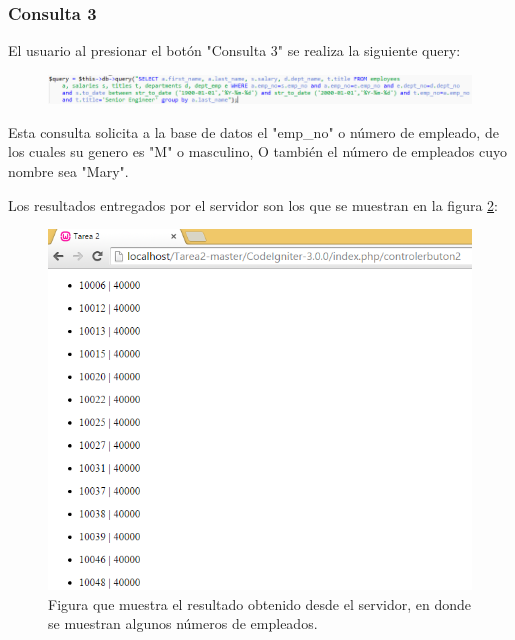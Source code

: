\subsubsection{Consulta 3}

El usuario al presionar el botón "Consulta 3" se realiza la siguiente query:

\begin{figure}[htb]
	\label{Figura6}
	\begin{center}
		\includegraphics[scale=0.7]{imagenes/query3.png}
	\end{center}
\end{figure}

Esta consulta solicita a la base de datos el "emp\_no" o número de empleado, de los cuales su genero es "M" o masculino, O también el número de empleados cuyo nombre sea "Mary".

Los resultados entregados por el servidor son los que se muestran en la figura \ref{Figura7}:

\begin{figure}[htb]
	\label{Figura7}
	\begin{center}
		\includegraphics[scale=0.7]{imagenes/resultado2.png}
		\caption{Figura que muestra el resultado obtenido desde el servidor, en donde se muestran algunos números de empleados.}
	\end{center}
\end{figure}


 
